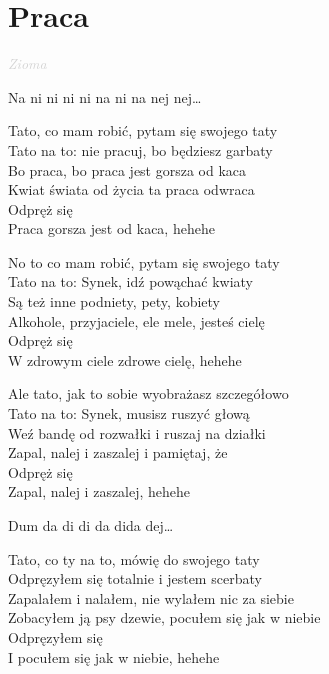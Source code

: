 \documentclass[a5paper, 10pt]{book}
\begin{document}
\section{Praca}\textcolor{lightgray}{\textit{Zioma}}\\
\begin{minipage}[t]{0.8\textwidth}
  Na ni ni ni ni na ni na nej nej…\vspace*{1.6mm}

  Tato, co mam robić, pytam się swojego taty\\
  Tato na to: nie pracuj, bo będziesz garbaty\\
  Bo praca, bo praca jest gorsza od kaca\\
  Kwiat świata od życia ta praca odwraca\\
  \hspace*{5mm}Odpręż się\\
  \hspace*{5mm}Praca gorsza jest od kaca, hehehe\vspace*{1.6mm}

  No to co mam robić, pytam się swojego taty\\
  Tato na to: Synek, idź powąchać kwiaty\\
  Są też inne podniety, pety, kobiety\\
  Alkohole, przyjaciele, ele mele, jesteś cielę\\
  \hspace*{5mm}Odpręż się\\
  \hspace*{5mm}W zdrowym ciele zdrowe cielę, hehehe\vspace*{1.6mm}

  Ale tato, jak to sobie wyobrażasz szczegółowo\\
  Tato na to: Synek, musisz ruszyć głową\\
  Weź bandę od rozwałki i ruszaj na działki\\
  Zapal, nalej i zaszalej i pamiętaj, że\\
  \hspace*{5mm}Odpręż się\\
  \hspace*{5mm}Zapal, nalej i zaszalej, hehehe\vspace*{1.6mm}

  Dum da di di da dida dej…\vspace*{1.6mm}

  Tato, co ty na to, mówię do swojego taty\\
  Odpręzyłem się totalnie i jestem scerbaty\\
  Zapalałem i nalałem, nie wylałem nic za siebie\\
  Zobacyłem ją psy dzewie, pocułem się jak w niebie\\
  \hspace*{5mm}Odpręzyłem się\\
  \hspace*{5mm}I pocułem się jak w niebie, hehehe\vspace*{1.6mm}


\end{minipage}
\end{document}
